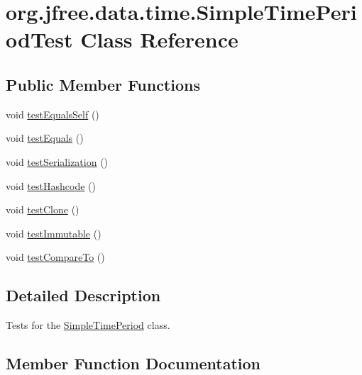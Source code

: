 \hypertarget{classorg_1_1jfree_1_1data_1_1time_1_1_simple_time_period_test}{}\section{org.\+jfree.\+data.\+time.\+Simple\+Time\+Period\+Test Class Reference}
\label{classorg_1_1jfree_1_1data_1_1time_1_1_simple_time_period_test}
\subsection*{Public Member Functions}
\begin{DoxyCompactItemize}
\item 
void \mbox{\hyperlink{classorg_1_1jfree_1_1data_1_1time_1_1_simple_time_period_test_a9bec151e0e8a5ba28dec99ea8784ff57}{test\+Equals\+Self}} ()
\item 
void \mbox{\hyperlink{classorg_1_1jfree_1_1data_1_1time_1_1_simple_time_period_test_affb414bc5c704a6df0c9a34378ae7c94}{test\+Equals}} ()
\item 
void \mbox{\hyperlink{classorg_1_1jfree_1_1data_1_1time_1_1_simple_time_period_test_a68647581c8b3c2e385d633ddafb526bc}{test\+Serialization}} ()
\item 
void \mbox{\hyperlink{classorg_1_1jfree_1_1data_1_1time_1_1_simple_time_period_test_a56a9128595f8a5381b179fdeca3e7b13}{test\+Hashcode}} ()
\item 
void \mbox{\hyperlink{classorg_1_1jfree_1_1data_1_1time_1_1_simple_time_period_test_a6afcd2782d2541e4b6d095c27a3b29a6}{test\+Clone}} ()
\item 
void \mbox{\hyperlink{classorg_1_1jfree_1_1data_1_1time_1_1_simple_time_period_test_acd3db45e71f6ab6b5bd3af04f2e76cca}{test\+Immutable}} ()
\item 
void \mbox{\hyperlink{classorg_1_1jfree_1_1data_1_1time_1_1_simple_time_period_test_abce635d02e1dcd80be4025d85ee80f91}{test\+Compare\+To}} ()
\end{DoxyCompactItemize}


\subsection{Detailed Description}
Tests for the \mbox{\hyperlink{classorg_1_1jfree_1_1data_1_1time_1_1_simple_time_period}{Simple\+Time\+Period}} class. 

\subsection{Member Function Documentation}
\mbox{\label{classorg_1_1jfree_1_1data_1_1time_1_1_simple_time_period_test_a6afcd2782d2541e4b6d095c27a3b29a6}} 
